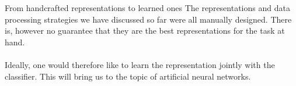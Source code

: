 \begin{parag}{From handcrafted representations to learned ones}
    The representations and data processing strategies we have discussed so far were all manually designed. There is, however no guarantee that they are the best representations for the task at hand. \\
	$ $\\
	Ideally, one would therefore like to learn the representation jointly with the classifier. This will bring us to the topic of artificial neural networks.
\end{parag}











	
	
	
